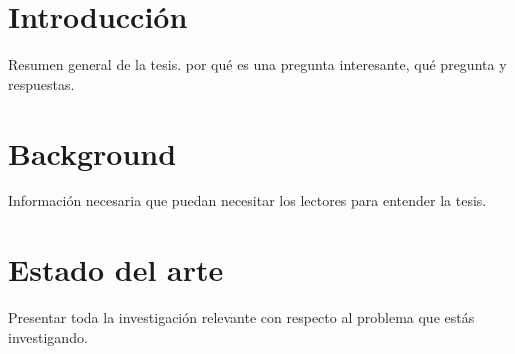 \documentclass[11pt,a4paper,twoside]{tesis}
\begin{document}

\def\autor{Fernando Gasperi Jabalera}
\def\tituloTesis{Refactorings automáticos de alto nivel}
\def\runtitulo{Refactorings automáticos de alto nivel}
\def\runtitle{High level automated refactorings}
\def\director{Hernán Wilkinson}
\def\lugar{Buenos Aires, 2020}


\frontmatter
\chapter{Introducción}
Resumen general de la tesis. por qué es una pregunta interesante, qué pregunta y respuestas.


\chapter{Background}
Información necesaria que puedan necesitar los lectores para entender la tesis.



\chapter{Estado del arte}
Presentar toda la investigación relevante con respecto al problema que estás investigando.

\end{document}
